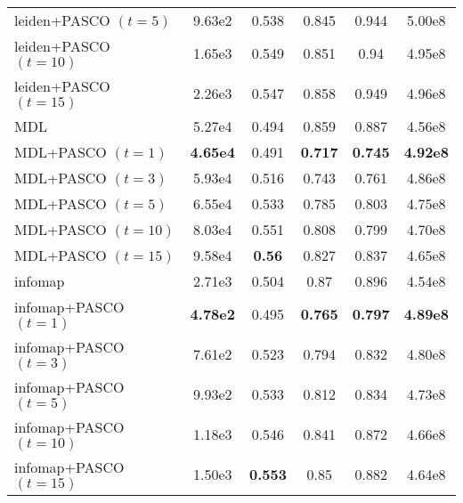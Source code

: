 \begin{tabular}{lccccc}
leiden+PASCO $(t=5)$ & 9.63e2 & 0.538 & 0.845 & 0.944 & 5.00e8 \\
leiden+PASCO $(t=10)$ & 1.65e3 & 0.549 & 0.851 & 0.94 & 4.95e8 \\
leiden+PASCO $(t=15)$ & 2.26e3 & 0.547 & 0.858 & 0.949 & 4.96e8 \\
\midrule
MDL & 5.27e4 & 0.494 & 0.859 & 0.887 & 4.56e8 \\
MDL+PASCO $(t=1)$ & \textbf{4.65e4} & 0.491 & \textbf{0.717} & \textbf{0.745} & \textbf{4.92e8} \\
MDL+PASCO $(t=3)$ & 5.93e4 & 0.516 & 0.743 & 0.761 & 4.86e8 \\
MDL+PASCO $(t=5)$ & 6.55e4 & 0.533 & 0.785 & 0.803 & 4.75e8 \\
MDL+PASCO $(t=10)$ & 8.03e4 & 0.551 & 0.808 & 0.799 & 4.70e8 \\
MDL+PASCO $(t=15)$ & 9.58e4 & \textbf{0.56} & 0.827 & 0.837 & 4.65e8 \\
\midrule
infomap & 2.71e3 & 0.504 & 0.87 & 0.896 & 4.54e8 \\
infomap+PASCO $(t=1)$ & \textbf{4.78e2} & 0.495 & \textbf{0.765} & \textbf{0.797} & \textbf{4.89e8} \\
infomap+PASCO $(t=3)$ & 7.61e2 & 0.523 & 0.794 & 0.832 & 4.80e8 \\
infomap+PASCO $(t=5)$ & 9.93e2 & 0.533 & 0.812 & 0.834 & 4.73e8 \\
infomap+PASCO $(t=10)$ & 1.18e3 & 0.546 & 0.841 & 0.872 & 4.66e8 \\
infomap+PASCO $(t=15)$ & 1.50e3 & \textbf{0.553} & 0.85 & 0.882 & 4.64e8 \\
\bottomrule
\end{tabular}